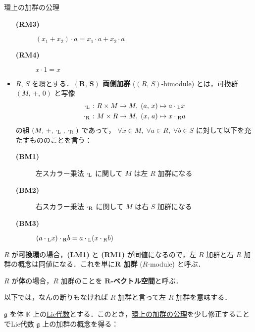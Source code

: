 \documentclass[rep_main]{subfiles}
\begin{document}
\begin{myaxiom}[label=ax:R-module,breakable]{環上の加群の公理}
\begin{itemize}
\begin{description}
			\item[\textbf{(RM3)}] $(x_1 + x_2) \cdot a = x_1 \cdot a + x_2 \cdot a$
			\item[\textbf{(RM4)}] $x \cdot 1 = x$
		\end{description}
		\item $R,\, S$ を環とする．\textbf{$\bm{(R,\, S)}$ 両側加群} ($(R,\, S)$-bimodule) とは，可換群 $(M,\, +,\, 0)$ と写像
		\begin{align}
			\cdot{}_{\mathrm{L}} \mathrel{} &\colon R \times M \to M,\; (a,\, x) \mapsto a \cdot{}_{\mathrm{L}} x \\
			\cdot{}_{\mathrm{R}} \mathrel{} &\colon M \times R \to M,\; (x,\, a) \mapsto x \cdot{}_{\mathrm{R}} a
		\end{align}
		の組  $(M,\, +,\, \cdot{}_{\mathrm{L}}\mathrel{},\, \cdot{}_{\mathrm{R}}\mathrel{})$ であって， 
		$\forall x\in M,\; \forall a\in R,\; \forall b \in S$ に対して以下を充たすもののことを言う：
		\begin{description}
			\item[\textbf{(BM1)}] 左スカラー乗法 $\cdot{}_{\mathrm{L}}$ に関して $M$ は左 $R$ 加群になる
			\item[\textbf{(BM2)}] 右スカラー乗法 $\cdot{}_{\mathrm{R}}$ に関して $M$ は右 $S$ 加群になる
			\item[\textbf{(BM3)}] $(a \cdot{}_{\mathrm{L}} x) \cdot{}_{\mathrm{R}} b = a \cdot{}_{\mathrm{L}} (x \cdot{}_{\mathrm{R}} b)$
		\end{description}
	\end{itemize}
\end{myaxiom}

$R$ が\textbf{可換環}の場合，\textsf{\textbf{(LM1)}} と \textsf{\textbf{(RM1)}} が同値になるので，左 $R$ 加群と右 $R$ 加群の概念は同値になる．これを単に\textbf{$\bm{R}$ 加群} ($R$-module) と呼ぶ．

$R$ が\textbf{体}の場合，$R$ 加群のことを \textbf{$\bm{R}$-ベクトル空間}と呼ぶ．

\begin{marker}
	以下では，なんの断りもなければ $R$ 加群と言って左 $R$ 加群を意味する．
\end{marker}

$\mathfrak{g}$ を体 $\mathbb{K}$ 上の\hyperref[ax:LieAlg]{Lie代数}とする．このとき，\hyperref[ax:R-module]{環上の加群の公理}を少し修正することでLie代数 $\mathfrak{g}$ 上の加群の概念を得る：
\end{document}
